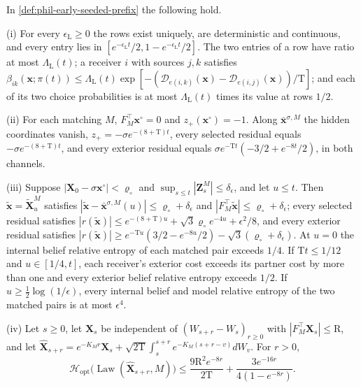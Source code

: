 In \cref{def:phil-early-seeded-prefix} the following hold.

(i) For every \(\epsilon_{\mathrm L}\ge0\) the rows exist uniquely, are
deterministic and continuous, and every entry lies in
\([e^{-\epsilon_{\mathrm L}t}/2,1-e^{-\epsilon_{\mathrm L}t}/2]\). The two
entries of a row have ratio at most \(\Lambda_{\mathrm L}(t)\); a receiver
\(i\) with sources \(j,k\) satisfies
\(\beta_{ik}(\mathbf x;\pi(t))\le\Lambda_{\mathrm L}(t)
\exp[-(\mathcal D_{e(i,k)}(\mathbf x)-\mathcal D_{e(i,j)}(\mathbf x))/\mathrm T]\);
and each of its two choice probabilities is at most
\(\Lambda_{\mathrm L}(t)\) times its value at rows \(1/2\).

(ii) For each matching \(M\), \(F_M^\top\mathbf x^\circ=0\) and
\(z_+(\mathbf x^\circ)=-1\). Along \(\bar{\mathbf x}^{\sigma,M}\) the hidden
coordinates vanish, \(z_+=-\sigma e^{-(8+\mathrm T)t}\), every selected
residual equals \(-\sigma e^{-(8+\mathrm T)t}\), and every exterior residual
equals \(\sigma e^{-\mathrm Tt}(-3/2+e^{-8t}/2)\), in both channels.

(iii) Suppose \(|\mathbf X_0-\sigma\mathbf x^\circ|<\varrho_\circ\) and
\(\sup_{s\le t}|\mathbf Z^M_s|\le\delta_\epsilon\), and let \(u\le t\). Then
\(\widetilde{\mathbf x}=\widetilde{\mathbf X}^M_u\) satisfies
\(|\widetilde{\mathbf x}-\bar{\mathbf x}^{\sigma,M}(u)|\le\varrho_\circ+\delta_\epsilon\)
and \(|F_M^\top\widetilde{\mathbf x}|\le\varrho_\circ+\delta_\epsilon\); every
selected residual satisfies
\(|r(\widetilde{\mathbf x})|\le e^{-(8+\mathrm T)u}+\sqrt3\varrho_\circ e^{-4u}+\epsilon^2/8\),
and every exterior residual satisfies
\(|r(\widetilde{\mathbf x})|\ge e^{-\mathrm Tu}(3/2-e^{-8u}/2)-\sqrt3(\varrho_\circ+\delta_\epsilon)\).
At \(u=0\) the internal belief relative entropy of each matched pair exceeds
\(1/4\). If \(\mathrm Tt\le1/12\) and \(u\in[1/4,t]\), each receiver's
exterior cost exceeds its partner cost by more than one and every exterior
belief relative entropy exceeds \(1/2\). If \(u\ge\frac12\log(1/\epsilon)\),
every internal belief and model relative entropy of the two matched pairs is
at most \(\epsilon^4\).

(iv) Let \(s\ge0\), let \(\mathbf X_s\) be independent of
\((W_{s+r}-W_s)_{r\ge0}\) with \(|F_M^\top\mathbf X_s|\le\mathrm R\), and let
\(\widehat{\mathbf X}_{s+r}=e^{-K_Mr}\mathbf X_s
+\sqrt{2\mathrm T}\int_s^{s+r}e^{-K_M(s+r-v)}dW_v\). For \(r>0\),
\[
 \mathcal H_{\mathrm{opt}}\bigl(\operatorname{Law}(\widehat{\mathbf X}_{s+r},M)\bigr)
 \le\frac{9\mathrm R^2e^{-8r}}{2\mathrm T}+\frac{3e^{-16r}}{4(1-e^{-8r})}.
\]

